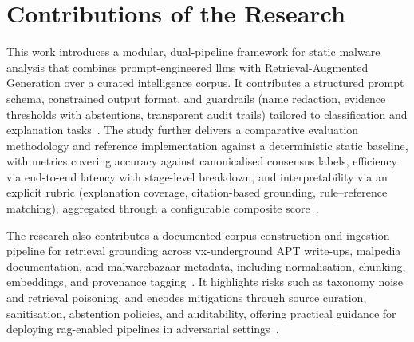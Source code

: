 \section{Contributions of the Research}\label{sec:Contributions}
This work introduces a modular, dual-pipeline framework for static \gls{malware} analysis that
combines prompt-engineered \glspl{llm} with Retrieval-Augmented Generation over a curated
intelligence corpus. It contributes a structured prompt schema, constrained output format, and
guardrails (name redaction, evidence thresholds with abstentions, transparent audit trails)
tailored to classification and explanation
tasks~\cite{lewis2020retrieval,gao2023retrieval,han2025guardrail,rexisLLMRagPipeline,rexisBaselinePipeline}.
The study further delivers a comparative evaluation methodology and reference implementation
against a deterministic static baseline, with metrics covering accuracy against canonicalised
consensus labels, efficiency via end-to-end latency with stage-level breakdown, and
interpretability via an explicit rubric (explanation coverage, citation-based grounding,
rule–reference matching), aggregated through a configurable composite
score~\cite{sahoo2024systematic,wong2021practice,fujii2024llm,nourmohammadzadeh2024llmsurvey}.

The research also contributes a documented corpus construction and ingestion pipeline for retrieval
grounding across \gls{vx-underground} APT write-ups, \gls{malpedia} documentation, and
\gls{malwarebazaar} metadata, including normalisation, chunking, embeddings, and provenance
tagging~\cite{rexisIngestionPipeline,plohmann2017malpedia}. It highlights risks such as taxonomy
noise and retrieval poisoning, and encodes mitigations through source curation, sanitisation,
abstention policies, and auditability, offering practical guidance for deploying \gls{rag}-enabled
pipelines in adversarial settings~\cite{gaber2024malware,zou2024poisonedrag}.


